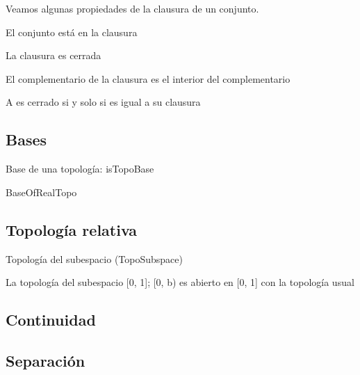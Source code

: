 Veamos algunas propiedades de la clausura de un conjunto.

\begin{proposition}
    El conjunto está en la clausura
\end{proposition}

\begin{proposition}
    La clausura es cerrada
\end{proposition}

\begin{proposition}
    El complementario de la clausura es el interior del complementario
\end{proposition}

\begin{proposition}
    A es cerrado si y solo si es igual a su clausura
\end{proposition}



\subsection{Bases}

\begin{definition}
  Base de una topología: isTopoBase
\end{definition}

\begin{example}
  BaseOfRealTopo
\end{example}

\subsection{Topología relativa}

\begin{definition}
  Topología del subespacio (TopoSubspace)
\end{definition}

\begin{example}
  La topología del subespacio [0, 1]; [0, b) es abierto en [0, 1] con la topología usual
\end{example}


\subsection{Continuidad}





\subsection{Separación}



